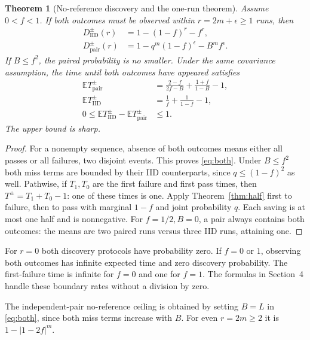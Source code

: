 \documentclass[11pt,a4paper]{article}
\newtheorem{theorem}{Theorem}[section]
\theoremstyle{definition}\newtheorem{definition}[theorem]{Definition}
\theoremstyle{remark}\newtheorem{remark}[theorem]{Remark}
\newcommand{\E}{\mathbb E}
\newcommand{\IID}{\mathrm{IID}}
\newcommand{\PAIR}{\mathrm{pair}}
\theoremstyle{definition}\newtheorem{xexample}[xtheorem]{Example}\theoremstyle{plain}
\begin{document}
\begin{theorem}[No-reference discovery and the one-run theorem]\label{thm:both}
Assume $0<f<1$. If both outcomes must be observed within $r=2m+\epsilon\ge1$ runs, then
\begin{align}
 D^{\pm}_{\IID}(r)&=1-(1-f)^r-f^r,\\
 D^{\pm}_{\PAIR}(r)&=1-q^m(1-f)^\epsilon-B^m f^\epsilon.\label{eq:both}
\end{align}
If $B\le f^2$, the paired probability is no smaller. Under the same covariance assumption, the time until both outcomes have appeared satisfies
\begin{align}
 \E T^{\pm}_{\PAIR}
 &=\frac{2-f}{2f-B}+\frac{1+f}{1-B}-1,\\
 \E T^{\pm}_{\IID}&=\frac1f+\frac1{1-f}-1,\\
 0\le\E T^{\pm}_{\IID}-\E T^{\pm}_{\PAIR}&\le1.
\end{align}
The upper bound is sharp.
\end{theorem}
\begin{proof}
For a nonempty sequence, absence of both outcomes means either all passes or all failures, two disjoint events. This proves \eqref{eq:both}. Under $B\le f^2$ both miss terms are bounded by their IID counterparts, since $q\le(1-f)^2$ as well. Pathwise, if $T_1,T_0$ are the first failure and first pass times, then $T^\pm=T_1+T_0-1$: one of these times is one. Apply Theorem~\ref{thm:half} first to failure, then to pass with marginal $1-f$ and joint probability $q$. Each saving is at most one half and is nonnegative. For $f=1/2,B=0$, a pair always contains both outcomes: the means are two paired runs versus three IID runs, attaining one.
\end{proof}
For $r=0$ both discovery protocols have probability zero. If $f=0$ or $1$, observing both outcomes has infinite expected time and zero discovery probability. The first-failure time is infinite for $f=0$ and one for $f=1$. The formulas in Section~4 handle these boundary rates without a division by zero.

The independent-pair no-reference ceiling is obtained by setting $B=L$ in \eqref{eq:both}, since both miss terms increase with $B$. For even $r=2m\ge2$ it is $1-|1-2f|^m$.
\end{document}
